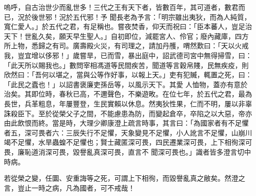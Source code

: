 \begin{pinyinscope}
 嗚呼，自古治世少而亂世多！三代之王有天下者，皆數百年，其可道者，數君而已，況於後世邪！況於五代邪！予
 聞長老為予言：「明宗雖出夷狄，而為人純質，寬仁愛人。」於五代之君，有足稱也。嘗夜焚香，仰天而祝曰：「臣本蕃人，豈足治天下！世亂久矣，願天早生聖人。」自初即位，減罷宮人、伶官；廢內藏庫，四方所上物，悉歸之有司。廣壽殿火災，有司理之，請加丹雘，喟然歎曰：「天以火戒我，豈宜增以侈邪！」歲嘗旱，已而雪，暴出庭中，詔武德司宮中無得掃雪，曰：「此天所以賜我也。」數問宰相馮道等民間疾苦，聞道等言穀帛賤，民無疾疫，則欣然曰：「吾何以堪之，當與公等作好事，以報上天。」吏有犯贓，輒置之死，曰：「此民之蠹也！」以詔書褒廉吏孫岳等，以風示天下。其愛
 人恤物，蓋亦有意於治矣。其即位時，春秋已高，不邇聲色，不樂遊畋。在位七年，於五代之君，最為長世，兵革粗息，年屢豐登，生民實賴以休息。然夷狄性果，仁而不明，屢以非辜誅殺臣下。至於從榮父子之間，不能慮患為防，而變起倉卒，卒陷之以大惡，帝亦由此飲恨而終。當是時，大理少卿康澄上疏言時事，其言曰：「為國家者有不足懼者五，深可畏者六：三辰失行不足懼，天象變見不足懼，小人訛言不足懼，山崩川竭不足懼，水旱蟲蝗不足懼也；賢士藏匿深可畏，四民遷業深可畏，上下相徇深可畏，廉恥道消深可畏，毀譽亂真深可畏，直言不
 聞深可畏也。」識者皆多澄言切中時病。



 若從榮之變，任圜、安重誨等之死，可謂上下相徇，而毀譽亂真之敝矣。然澄之言，豈止一時之病，凡為國者，可不戒哉！



\end{pinyinscope}